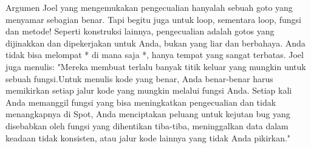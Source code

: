 Argumen Joel yang mengemukakan pengecualian hanyalah sebuah goto yang menyamar sebagian benar. Tapi begitu juga untuk loop, sementara loop, fungsi dan metode! Seperti konstruksi lainnya, pengecualian adalah gotos yang dijinakkan dan dipekerjakan untuk Anda, bukan yang liar dan berbahaya. Anda tidak bisa melompat * di mana saja *, hanya tempat yang sangat terbatas.
Joel juga menulis:
"Mereka membuat terlalu banyak titik keluar yang mungkin untuk sebuah fungsi.Untuk menulis kode yang benar, Anda benar-benar harus memikirkan setiap jalur kode yang mungkin melalui fungsi Anda. Setiap kali Anda memanggil fungsi yang bisa meningkatkan pengecualian dan tidak menangkapnya di Spot, Anda menciptakan peluang untuk kejutan bug yang disebabkan oleh fungsi yang dihentikan tiba-tiba, meninggalkan data dalam keadaan tidak konsisten, atau jalur kode lainnya yang tidak Anda pikirkan."
